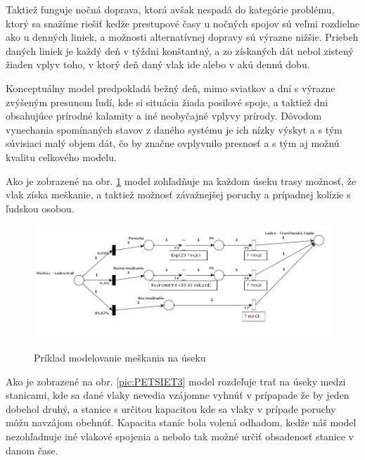\documentclass[11pt,a4paper]{article}
\begin{document}
Taktiež funguje nočná doprava, ktorá avšak nespadá do kategórie problému, ktorý sa snažíme riešiť kedže prestupové časy u nočných spojov sú veľmi rozdielne ako u denných liniek, a možnosti alternatívnej dopravy sú výrazne nižšie.
Priebeh daných liniek je každý deň v týždni konštantný, a zo získaných dát nebol zistený žiaden vplyv toho, v ktorý deň daný vlak ide alebo v akú dennú dobu.

Konceptuálny model predpokladá bežný deň, mimo sviatkov a dní s výrazne zvýšeným presunom ľudí, kde si situácia žiada posilové spoje, a taktiež dni obsahujúce prírodné kalamity a iné neobyčajné vplyvy prírody.
Dôvodom vynechania spomínaných stavov z daného systému je ich nízky výskyt a s tým súvisiaci malý objem dát, čo by značne ovplyvnilo presnosť a s tým aj možnú kvalitu celkového modelu.

Ako je zobrazené na  obr. \ref{pic:PETSIET2} model zohľadňuje na každom úseku trasy možnosť, že vlak získa meškanie, a taktiež možnosť závažnejšej poruchy a prípadnej kolízie s ľudskou osobou.

\begin{figure}[H]
    \begin{center}
    \scalebox{0.6}
    {
        \includegraphics{Petri_net_2.png}
    }
    \caption{Príklad modelovanie meškania na úseku}
    \label{pic:PETSIET2}
    \end{center}
\end{figure}

Ako je zobrazené na  obr. \ref{pic:PETSIET3} model rozdeľuje trať na úseky medzi stanicami, kde sa dané vlaky nevedia vzájomne vyhnúť v prípapade že by jeden dobehol druhý, a stanice s určitou kapacitou kde sa vlaky v prípade poruchy môžu navzájom obehnúť.
Kapacita staníc bola volená odhadom, kedže náš model nezohľadnuje iné vlakové spojenia a nebolo tak možné určiť obsadenosť stanice v danom čase.
\end{document}
